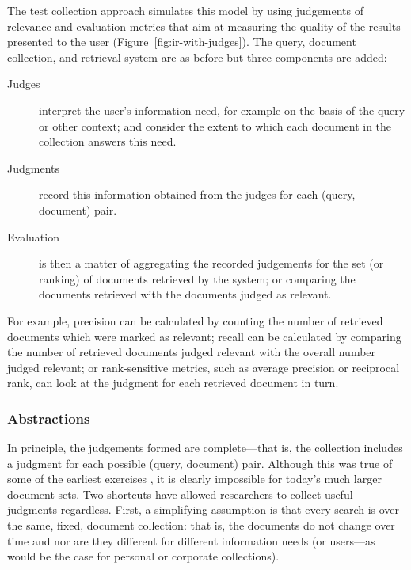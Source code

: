 The test collection approach simulates this model by using judgements of relevance and evaluation metrics that aim at measuring the quality of the results presented to the user  (Figure~\ref{fig:ir-with-judges}). The query, document collection, and retrieval system are as before but three components are added:


\begin{description}
	\item[Judges] interpret the user's information need, for example on the basis of the query or other context; and consider the extent to which each document in the collection answers this need.
	
	\item[Judgments] record this information obtained from the judges for each (query, document) pair.
	
	\item[Evaluation] is then a matter of aggregating the recorded judgements for the set (or ranking) of documents retrieved by the system; or comparing the documents retrieved with the documents judged as relevant.
\end{description}

For example, precision can be calculated by counting the number of retrieved documents which were marked as relevant; recall can be calculated by comparing the number of retrieved documents judged relevant with the overall number judged relevant; or rank-sensitive metrics, such as average precision or reciprocal rank, can look at the judgment for each retrieved document in turn.

\subsubsection{Abstractions}
In principle, the judgements formed are complete---that is, the collection includes a judgment for each possible (query, document) pair. Although this was true of some of the earliest exercises \citep{cleverdon66}, it is clearly impossible for today's much larger document sets. Two shortcuts have allowed researchers to collect useful judgments regardless.  First, a simplifying assumption is that every search is over the same, fixed, document collection: that is, the documents do not change over time and nor are they different for different information needs (or users---as would be the case for personal or corporate collections).


